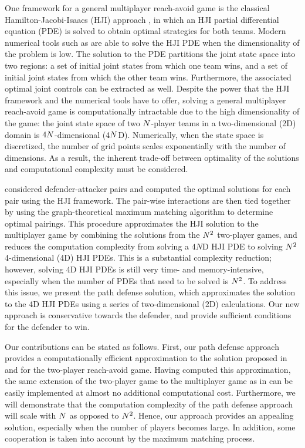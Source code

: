 One framework for a general multiplayer reach-avoid game is the classical Hamilton-Jacobi-Isaacs (HJI) approach \cite{b:isaacs-1967}, in which an HJI partial differential equation (PDE) is solved to obtain optimal strategies for both teams. Modern numerical tools such as \cite{j:mitchell-TAC-2005, Sethian1996, b:osher-fedkiw-2002} are able to solve the HJI PDE when the dimensionality of the problem is low. The solution to the PDE partitions the joint state space into two regions: a set of initial joint states from which one team wins, and a set of initial joint states from which the other team wins. Furthermore, the associated optimal joint controls can be extracted as well. Despite the power that the HJI framework and the numerical tools have to offer, solving a general multiplayer reach-avoid game is computationally intractable due to the high dimensionality of the game: the joint state space of two $N$-player teams in a two-dimensional (2D) domain is $4N$-dimensional (4$N$D). Numerically, when the state space is discretized, the number of grid points scales exponentially with the number of dimensions. As a result, the inherent trade-off between optimality of the solutions and computational complexity must be considered. 

\cite{Chen2014} considered defender-attacker pairs and computed the optimal solutions for each pair using the HJI framework. The pair-wise interactions are then tied together by using the graph-theoretical maximum matching algorithm \cite{Schrjiver2004, Karpinski1998} to determine optimal pairings. This procedure approximates the HJI solution to the multiplayer game by combining the solutions from the $N^2$ two-player games, and reduces the computation complexity from solving a $4N$D HJI PDE to solving $N^2$ 4-dimensional (4D) HJI PDEs. This is a substantial complexity reduction; however, solving 4D HJI PDEs is still very time- and memory-intensive, especially when the number of PDEs that need to be solved is $N^2$. To address this issue, we present the path defense solution, which approximates the solution to the 4D HJI PDEs using a series of two-dimensional (2D) calculations. Our new approach is conservative towards the defender, and provide sufficient conditions for the defender to win.

Our contributions can be stated as follows. First, our path defense approach provides a computationally efficient approximation to the solution proposed in \cite{Huang2011} and \cite{Chen2014} for the two-player reach-avoid game. Having computed this approximation, the same extension of the two-player game to the multiplayer game as in \cite{Chen2014} can be easily implemented at almost no additional computational cost. Furthermore, we will demonstrate that the computation complexity of the path defense approach will scale with $N$ as opposed to $N^2$. Hence, our approach provides an appealing solution, especially when the number of players becomes large. In addition, some cooperation is taken into account by the maximum matching process. 

